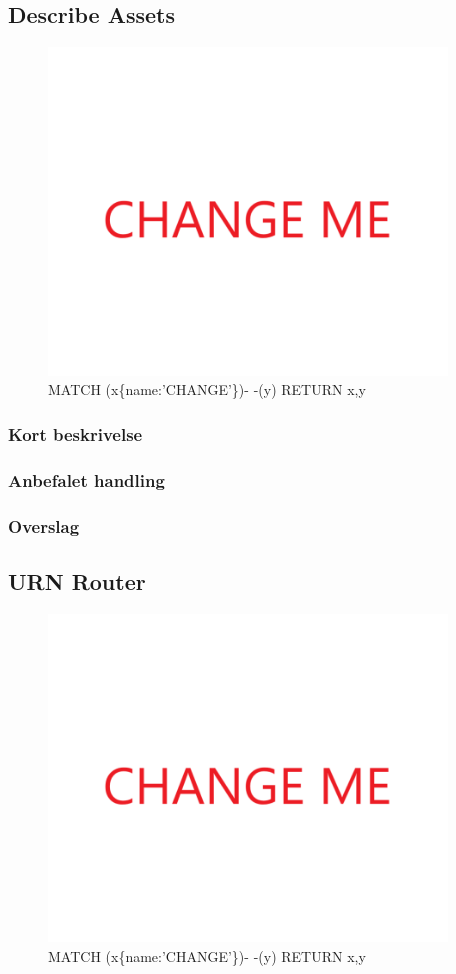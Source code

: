\documentclass{article}
\begin{document}
\subsection{Describe Assets}
\begin{figure}[h]
\includegraphics[width=300pt]{CHANGE.PNG}
\caption{MATCH (x\{name:'CHANGE'\})- -(y) RETURN x,y}
\end{figure}
\subsubsection{Kort beskrivelse}
\subsubsection{Anbefalet handling}
\subsubsection{Overslag}
\subsection{URN Router}
\begin{figure}[h]
\includegraphics[width=300pt]{CHANGE.PNG}
\caption{MATCH (x\{name:'CHANGE'\})- -(y) RETURN x,y}
\end{figure}
\end{document}

